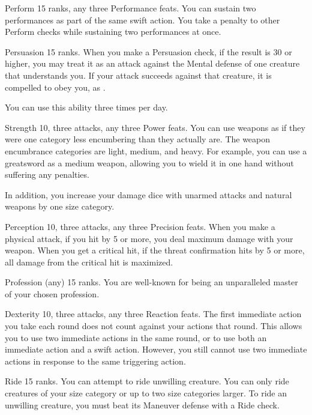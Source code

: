 \featpres Perform 15 ranks, any three Performance feats.
\featben You can sustain two performances as part of the same swift action.
You take a  penalty to other Perform checks while sustaining two performances at once.

\featpre Persuasion 15 ranks.
\featben When you make a Persuasion check, if the result is 30 or higher, you may treat it as an attack against the Mental defense of one creature that understands you.
If your attack succeeds against that creature, it is compelled to obey you, as .

You can use this ability three times per day.

\featpres Strength 10, three attacks, any three Power feats.
\featben You can use weapons as if they were one category less encumbering than they actually are.
The weapon encumbrance categories are light, medium, and heavy.
For example, you can use a greatsword as a medium weapon, allowing you to wield it in one hand without suffering any penalties.

In addition, you increase your damage dice with unarmed attacks and natural weapons by one size category.

\featpres Perception 10, three attacks, any three Precision feats.
\featben When you make a physical attack, if you hit by 5 or more, you deal maximum damage with your weapon.
When you get a critical hit, if the threat confirmation hits by 5 or more, all damage from the critical hit is maximized.

\featpre Profession (any) 15 ranks.
\featben You are well-known for being an unparalleled master of your chosen profession.

\featpres Dexterity 10, three attacks, any three Reaction feats.
\featben The first immediate action you take each round does not count against your actions that round.
This allows you to use two immediate actions in the same round, or to use both an immediate action and a swift action.
However, you still cannot use two immediate actions in response to the same triggering action.

\featpre Ride 15 ranks.
\featben You can attempt to ride unwilling creature.
You can only ride creatures of your size category or up to two size categories larger.
To ride an unwilling creature, you must beat its Maneuver defense with a Ride check.


